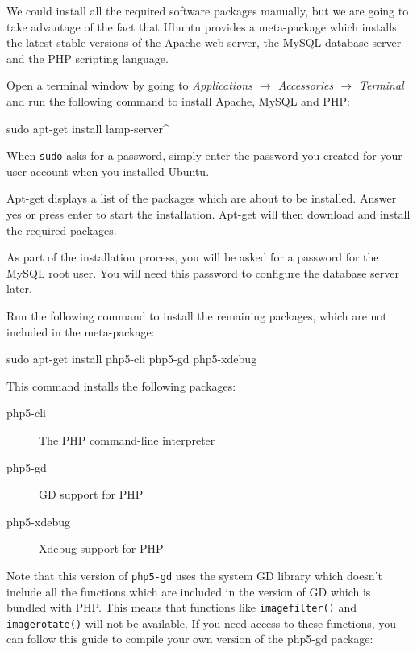 \documentclass[ebook,10pt,twoside,openright]{memoir}
\begin{document}
We could install all the required software packages manually, but we are going to take advantage of the fact that Ubuntu provides a meta-package which installs the latest stable versions of the Apache web server, the MySQL database server and the PHP scripting language.

Open a terminal window by going to \emph{Applications $\rightarrow$ Accessories $\rightarrow$ Terminal} and run the following command to install Apache, MySQL and PHP:

\begin{squashboxcommand}
sudo apt-get install lamp-server^
\end{squashboxcommand}

When \verb!sudo! asks for a password, simply enter the password you created for your user account when you installed Ubuntu.

Apt-get displays a list of the packages which are about to be installed. Answer yes or press enter to start the installation. Apt-get will then download and install the required packages.
  
As part of the installation process, you will be asked for a password for the MySQL root user. You will need this password to configure the database server later.

Run the following command to install the remaining packages, which are not included in the meta-package:

\begin{squashboxcommand}
sudo apt-get install php5-cli php5-gd php5-xdebug
\end{squashboxcommand}

This command installs the following packages:

\begin{description}
\item[php5-cli] The PHP command-line interpreter
\item[php5-gd] GD support for PHP
\item[php5-xdebug] Xdebug support for PHP
\end{description}

Note that this version of \verb!php5-gd! uses the system GD library which doesn’t include all the functions which are included in the version of GD which is bundled with PHP. This means that functions like \verb!imagefilter()! and \verb!imagerotate()! will not be available. If you need access to these functions, you can follow this guide to compile your own version of the php5-gd package:
\end{document}
